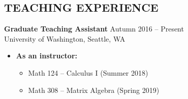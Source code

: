 \documentclass[margin]{res} %
\begin{document}
\begin{resume}
\newpage
 
\section{TEACHING EXPERIENCE}

{\bf Graduate Teaching Assistant} \hfill Autumn 2016 -- Present \\
University of Washington, Seattle, WA

\begin{itemize} \itemsep -1pt %
\item\textbf{As an instructor:} 
\begin{itemize}
	\item Math 124 -- Calculus I (Summer 2018)\vspace{5pt}

	\item Math 308 -- Matrix Algebra (Spring 2019)\vspace{5pt}
	

\end{itemize}
\end{itemize}
\end{resume}
\end{document}
